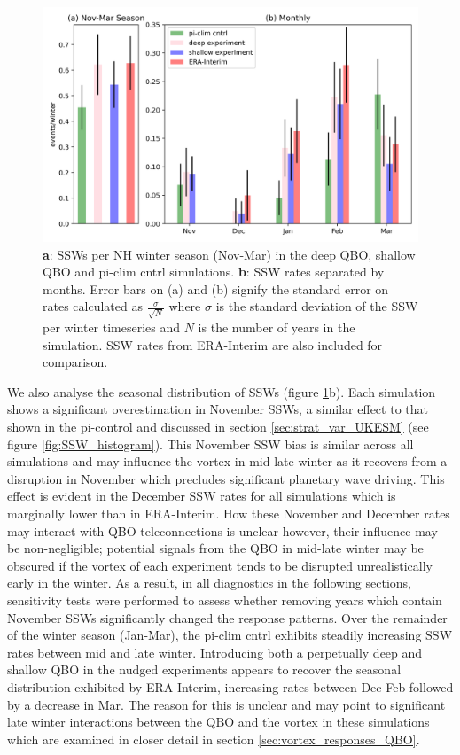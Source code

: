 \begin{figure}[h!]
\begin{center}
\noindent\includegraphics[width = 0.8\linewidth]{Figures/Figures-deepQBO/SSW_hist.png}
\caption[SSWs per NH winter season in QBO experiments]{\textbf{a}: SSWs per NH winter season (Nov-Mar) in the deep QBO, shallow QBO and pi-clim cntrl simulations. \textbf{b}: SSW rates separated by months. Error bars on (a) and (b) signify the standard error on rates calculated as $\frac{\sigma}{\sqrt{N}}$ where $\sigma$ is the standard deviation of the SSW per winter timeseries and $N$ is the number of years in the simulation. SSW rates from ERA-Interim are also included for comparison.}
\label{fig:SSW_histogram_experiments}
\end{center}
\end{figure}

We also analyse the seasonal distribution of SSWs (figure \ref{fig:SSW_histogram_experiments}b). Each simulation shows a significant overestimation in November SSWs, a similar effect to that shown in the pi-control and discussed in section \ref{sec:strat_var_UKESM} (see figure \ref{fig:SSW_histogram}). This November SSW bias is similar across all simulations and may influence the vortex in mid-late winter as it recovers from a disruption in November which precludes significant planetary wave driving. This effect is evident in the December SSW rates for all simulations which is marginally lower than in ERA-Interim. How these November and December rates may interact with QBO teleconnections is unclear however, their influence may be non-negligible; potential signals from the QBO in mid-late winter may be obscured if the vortex of each experiment tends to be disrupted unrealistically early in the winter. As a result, in all diagnostics in the following sections, sensitivity tests were performed to assess whether removing years which contain November SSWs significantly changed the response patterns. Over the remainder of the winter season (Jan-Mar), the pi-clim cntrl exhibits steadily increasing SSW rates between mid and late winter. Introducing both a perpetually deep and shallow QBO in the nudged experiments appears to recover the seasonal distribution exhibited by ERA-Interim, increasing rates between Dec-Feb followed by a decrease in Mar. The reason for this is unclear and may point to significant late winter interactions between the QBO and the vortex in these simulations which are examined in closer detail in section \ref{sec:vortex_responses_QBO}.

